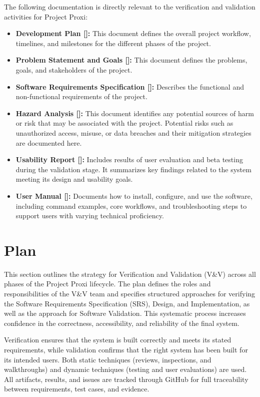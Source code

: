 \documentclass[12pt, titlepage]{article}
\begin{document}
The following documentation is directly relevant to the verification and
validation activities for Project Proxi:
\begin{itemize}
  \item \textbf{Development Plan [\citet{DevPlan}]:} This document
  defines the overall project workflow, timelines, and milestones for
  the different phases of the project.
  \item \textbf{Problem Statement and Goals [\citet{ProbStatement}]:}
  This document defines the problems, goals, and stakeholders of the
  project.
  \item \textbf{Software Requirements Specification [\citet{SRS}]:}
  Describes the functional and non-functional requirements of the
  project.
  \item \textbf{Hazard Analysis [\citet{HazardAnalysis}]:} This
  document identifies any potential sources of harm or risk that may be
  associated with the project. Potential risks such as unauthorized
  access, misuse, or data breaches and their mitigation strategies are
  documented here.
  \item \textbf{Usability Report [\citet{UsabilityReport}]:} Includes
  results of user evaluation and beta testing during the validation
  stage. It summarizes key findings related to the system meeting its
  design and usability goals.
  \item \textbf{User Manual [\citet{UserManual}]:} Documents how to
  install, configure, and use the software, including command examples,
  core workflows, and troubleshooting steps to support users with
  varying technical proficiency.
\end{itemize}

\section{Plan}
This section outlines the strategy for Verification and Validation (V\&V)
across all phases of the Project Proxi lifecycle. The plan defines the roles
and responsibilities of the V\&V team and specifies structured approaches for
verifying the Software Requirements Specification (SRS), Design, and
Implementation, as well as the approach for Software Validation. This
systematic process increases confidence in the correctness, accessibility,
and reliability of the final system.

Verification ensures that the system is built correctly and meets its stated
requirements, while validation confirms that the right system has been built
for its intended users. Both static techniques (reviews, inspections, and
walkthroughs) and dynamic techniques (testing and user evaluations) are used.
All artifacts, results, and issues are tracked through GitHub for full
traceability between requirements, test cases, and evidence.
\end{document}

